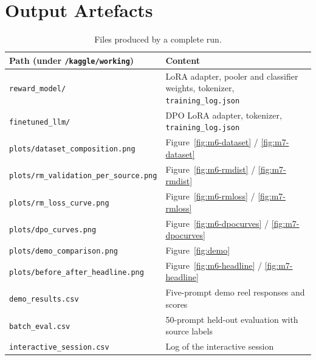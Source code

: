 \section{Output Artefacts}
\begin{table}[!htbp]
\centering
\caption[Files produced by a complete run]{Files produced by a complete run.}
\label{tab:artefacts}
\small
\begin{tabularx}{\textwidth}{@{}L{5.6cm}Y@{}}
\toprule
\textbf{Path (under \texttt{/kaggle/working})} & \textbf{Content}\\
\midrule
\texttt{reward\_model/} & LoRA adapter, pooler and classifier weights, tokenizer, \texttt{training\_log.json}\\
\texttt{finetuned\_llm/} & DPO LoRA adapter, tokenizer, \texttt{training\_log.json}\\
\texttt{plots/}\allowbreak\texttt{dataset\_composition.png} & Figure~\ref{fig:m6-dataset} / \ref{fig:m7-dataset}\\
\texttt{plots/}\allowbreak\texttt{rm\_validation\_per\_source.png} & Figure~\ref{fig:m6-rmdist} / \ref{fig:m7-rmdist}\\
\texttt{plots/}\allowbreak\texttt{rm\_loss\_curve.png} & Figure~\ref{fig:m6-rmloss} / \ref{fig:m7-rmloss}\\
\texttt{plots/}\allowbreak\texttt{dpo\_curves.png} & Figure~\ref{fig:m6-dpocurves} / \ref{fig:m7-dpocurves}\\
\texttt{plots/}\allowbreak\texttt{demo\_comparison.png} & Figure~\ref{fig:demo}\\
\texttt{plots/}\allowbreak\texttt{before\_after\_headline.png} & Figure~\ref{fig:m6-headline} / \ref{fig:m7-headline}\\
\texttt{demo\_results.csv} & Five-prompt demo reel responses and scores\\
\texttt{batch\_eval.csv} & 50-prompt held-out evaluation with source labels\\
\texttt{interactive\_session.csv} & Log of the interactive session\\
\bottomrule
\end{tabularx}
\end{table}

